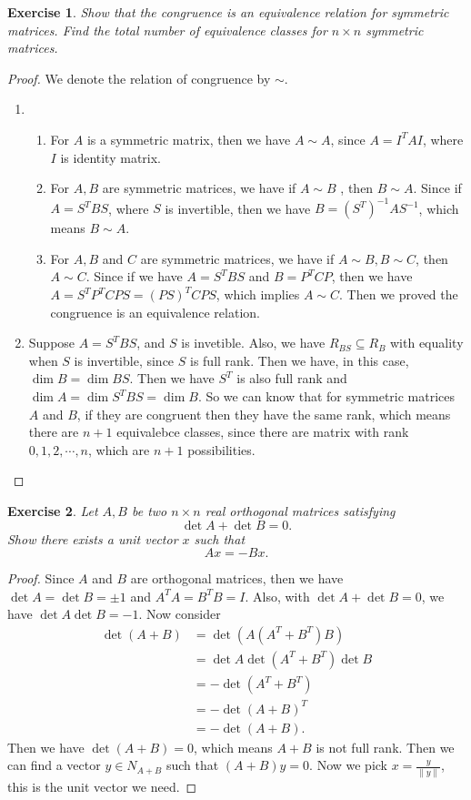 \documentclass[11pt]{book}
\newtheorem{exercise}{Exercise}[section]
\theoremstyle{definition}
\numberwithin{equation}{subsection}
\begin{document}
\medskip

\begin{exercise}
Show that the congruence is an equivalence relation for symmetric
matrices. Find the total number of equivalence classes for $n\times n$
symmetric matrices.
\end{exercise}
\begin{proof}
We denote the relation of congruence by $\sim$.
\begin{enumerate}[label=(\arabic*)]
    \item \begin{enumerate}[label=\alph*.]
        \item For $A$ is a symmetric matrix, then we have $A\sim A$, since $A = I^TAI$, where $I$ is identity matrix.
        \item For $A,B$ are symmetric matrices, we have if $A\sim B$ , then $B\sim A$. Since if $A = S^TBS$, where $S$ is invertible, then we have $B = (S^T)^{-1}AS^{-1}$, which means $B\sim A$.
        \item For $A,B$ and $C$ are symmetric matrices, we have if $A\sim B,B\sim C$, then $A\sim C$. Since if we have $A = S^TBS$ and $B = P^TCP$, then we have $A = S^TP^TCPS = (PS)^TCPS$, which implies $A\sim C$. Then we proved the congruence is an equivalence relation.
    \end{enumerate}
    \item Suppose $A = S^TBS$, and $S$ is invetible. Also, we have $R_{BS}\subseteq R_{B}$ with equality when $S$ is invertible, since $S$ is full rank. Then we have, in this case, $\dim B = \dim BS$. Then we have $S^T$ is also full rank and $\dim A = \dim S^TBS = \dim B$. So we can know that for symmetric matrices $A$ and $B$, if they are congruent then they have the same rank, which means there are $n+1$ equivalebce classes, since there are matrix with rank $0,1,2,\cdots,n$, which are $n+1$ possibilities.
\end{enumerate}
\end{proof}

\medskip

\begin{exercise}
Let $A,B$ be two $n\times n$ real orthogonal matrices satisfying
$$\det A+\det B=0.$$
Show there exists a unit vector $x$ such that%
$$Ax=-Bx.$$
\end{exercise}
\begin{proof}
Since $A$ and $B$ are orthogonal matrices, then we have $\det A = \det B = \pm 1$ and $A^TA = B^TB = I$. Also, with $\det A+\det B=0$, we have $\det A\det B = -1$. Now consider 
\begin{align*}
    \det(A+B) & = \det(A(A^T+B^T)B) \\
    & = \det A \det(A^T+B^T) \det B \\
    & = - \det(A^T+B^T) \\
    & = - \det(A+B)^T  \\
    &= - \det(A+B).
\end{align*}
Then we have $\det(A+B) = 0$, which means $A+B$ is not full rank. Then we can find a vector $y\in N_{A+B}$ such that $(A+B)y = 0$. Now we pick $x = \frac{y}{\|y\|}$, this is the unit vector we need.
\end{proof}
\end{document}
